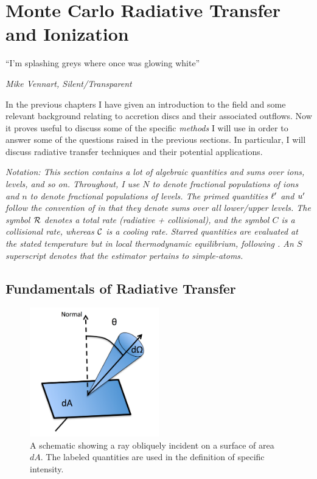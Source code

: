 \chapter{Monte Carlo Radiative Transfer and Ionization}

\epigraph{``I'm splashing greys where once was glowing white''}{{\sl Mike Vennart, Silent/Transparent}}

In the previous chapters I have given an introduction to the field and 
some relevant background relating to accretion 
discs and their associated outflows. Now it proves useful
to discuss some of the specific {\em methods} I will use
in order to answer some of the questions raised in the previous sections.
In particular, I will discuss radiative transfer techniques and 
their potential applications.

{\sl Notation: This section contains a lot of algebraic quantities and sums over
ions, levels, and so on. Throughout, I use $N$ to denote fractional
populations of ions and $n$ to denote fractional populations of levels. 
The primed quantities ${\ell^\prime}$ and ${u^\prime}$ follow the convention of 
\cite{lucy2002} in that they denote sums over all lower/upper levels.
The symbol ${\cal R}$ denotes a total rate (radiative + collisional), 
and the symbol $C$ is a collisional rate, whereas ${\cal C}$ is a cooling 
rate. Starred quantities are evaluated at the stated temperature but 
in local thermodynamic equilibrium, following \cite{mihalas}. An $S$ 
superscript denotes that the estimator pertains to simple-atoms.
}



\section{Fundamentals of Radiative Transfer}

\begin{figure}
\centering
\includegraphics[width=0.5\textwidth]{figures/03-radtrans/rays_schematic.png}
\caption
{
A schematic showing a ray obliquely incident on a surface of area $dA$.
The labeled quantities are used in the definition of specific intensity.
} 
\label{fig:ray}
\end{figure}

